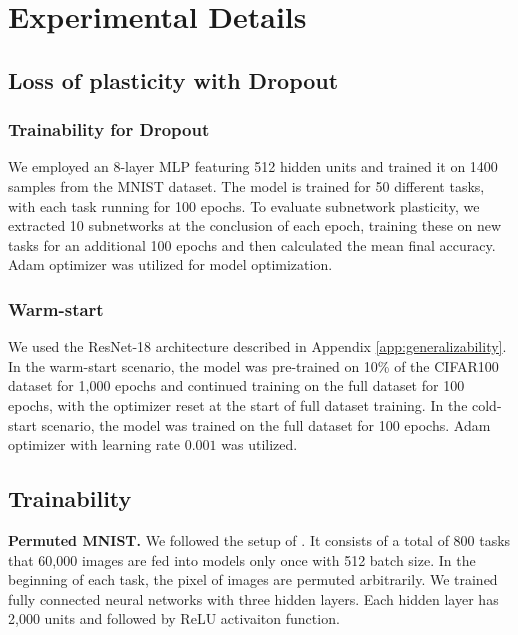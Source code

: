 

\section{Experimental Details}
\label{app:experimental_details}

\subsection{Loss of plasticity with Dropout}
\label{app:loss_pl_dropout}

\subsubsection{Trainability for Dropout}
\label{app:loss_pl_dropout_trainability}
We employed an 8-layer MLP featuring 512 hidden units and trained it on 1400 samples from the MNIST dataset.
The model is trained for 50 different tasks, with each task running for 100 epochs.
To evaluate subnetwork plasticity, we extracted 10 subnetworks at the conclusion of each epoch, training these on new tasks for an additional 100 epochs and then calculated the mean final accuracy.
Adam optimizer was utilized for model optimization.


\subsubsection{Warm-start}
We used the ResNet-18 architecture described in Appendix \ref{app:generalizability}.
In the warm-start scenario, the model was pre-trained on 10\% of the CIFAR100 dataset for 1,000 epochs and continued training on the full dataset for 100 epochs, with the optimizer reset at the start of full dataset training.
In the cold-start scenario, the model was trained on the full dataset for 100 epochs. Adam optimizer with learning rate $0.001$ was utilized.


\subsection{Trainability}
\label{app:trainability}
\textbf{Permuted MNIST. }
We followed the setup of \cite{dohare2024loss}.
It consists of a total of 800 tasks that 60,000 images are fed into models only once with 512 batch size.
In the beginning of each task, the pixel of images are permuted arbitrarily.
We trained fully connected neural networks with three hidden layers.
Each hidden layer has 2,000 units and followed by ReLU activaiton function.


